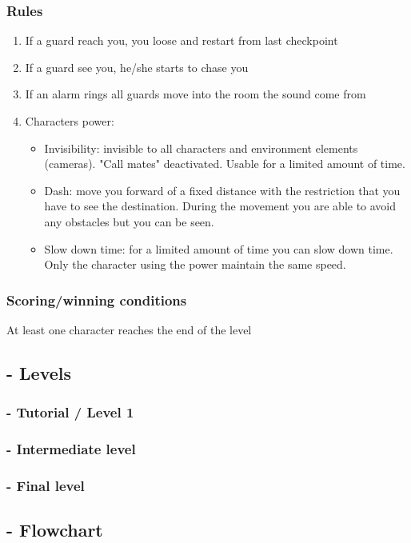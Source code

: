 \subsubsection{Rules}
\begin{enumerate}  
\item If a guard reach you, you loose and restart from last checkpoint
\item If a guard see you, he/she starts to chase you
\item If an alarm rings all guards move into the room the sound come from
\item Characters power: 	\begin{itemize}
					\item Invisibility: invisible to all characters and environment elements (cameras). "Call mates" deactivated. Usable for a limited amount of time.
					\item Dash: move you forward of a fixed distance with the restriction that you have to see the destination. During the movement you are able to avoid any obstacles but you can be seen.
					\item Slow down time: for a limited amount of time you can slow down time. Only the character using the power maintain the same speed. 
					\end{itemize}
\end{enumerate}

\subsubsection{Scoring/winning conditions}
At least one character reaches the end of the level

\subsection{- Levels}
\subsubsection{- Tutorial / Level 1}
\subsubsection{- Intermediate level}
\subsubsection{- Final level}

\subsection{- Flowchart}

